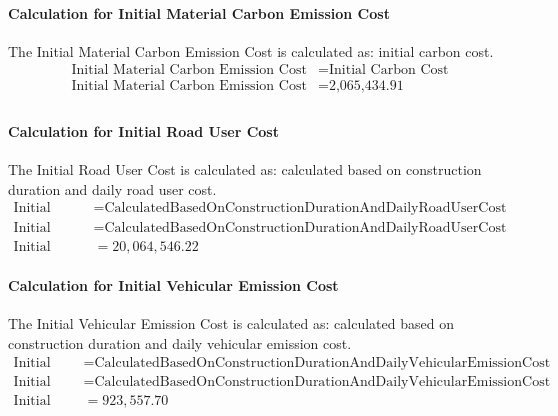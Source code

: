 \documentclass{article}
\begin{document}
 \paragraph{Calculation for Initial Material Carbon Emission Cost} 
The Initial Material Carbon Emission Cost is calculated as: initial carbon cost.
\begin{align*}
 \text{Initial Material Carbon Emission Cost} &= \text{Initial Carbon Cost} \\
 \text{Initial Material Carbon Emission Cost} &= \text{2,065,434.91} \\
\end{align*}
 \paragraph{Calculation for Initial Road User Cost} 
The Initial Road User Cost is calculated as: calculated based on construction duration and daily road user cost.
\begin{align*}
 \text{Initial Road User Cost} &= \text{Calculated} \text{Based} \text{On} \text{Construction} \text{Duration} \text{And} \text{Daily} \text{Road} \text{User} \text{Cost} \\
 \text{Initial Road User Cost} &= \text{Calculated} \text{Based} \text{On} \text{Construction} \text{Duration} \text{And} \text{Daily} \text{Road} \text{User} \text{Cost} \\
 \text{Initial Road User Cost} &= 20,064,546.22 
\end{align*}
 \paragraph{Calculation for Initial Vehicular Emission Cost} 
The Initial Vehicular Emission Cost is calculated as: calculated based on construction duration and daily vehicular emission cost.
\begin{align*}
 \text{Initial Vehicular Emission Cost} &= \text{Calculated} \text{Based} \text{On} \text{Construction} \text{Duration} \text{And} \text{Daily} \text{Vehicular} \text{Emission} \text{Cost} \\
 \text{Initial Vehicular Emission Cost} &= \text{Calculated} \text{Based} \text{On} \text{Construction} \text{Duration} \text{And} \text{Daily} \text{Vehicular} \text{Emission} \text{Cost} \\
 \text{Initial Vehicular Emission Cost} &= 923,557.70 
\end{align*}
\end{document}
